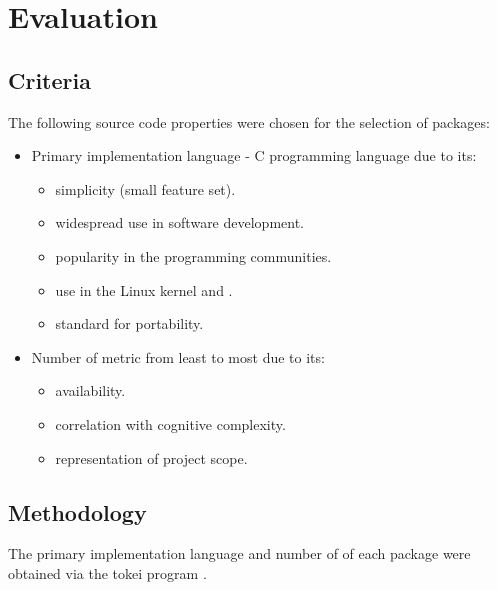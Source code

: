 \section{Evaluation}\label{Evaluation}

\subsection{Criteria}

The following source code properties were chosen for the selection of packages:

\begin{itemize}
    \item Primary implementation language - C programming language due to its:
    \begin{itemize}
        \item simplicity (small feature set).
        \item widespread use in software development.
        \item popularity in the programming communities.
        \item use in the Linux kernel and .
        \item standard for  portability.
    \end{itemize}
    \item Number of  metric from least to most due to its:
    \begin{itemize}
        \item availability.
        \item correlation with cognitive complexity.
        \item representation of project scope.
    \end{itemize}
\end{itemize}

\subsection{Methodology}

The primary implementation language and number of  of each package were obtained via the tokei program \cite{tokei}.
